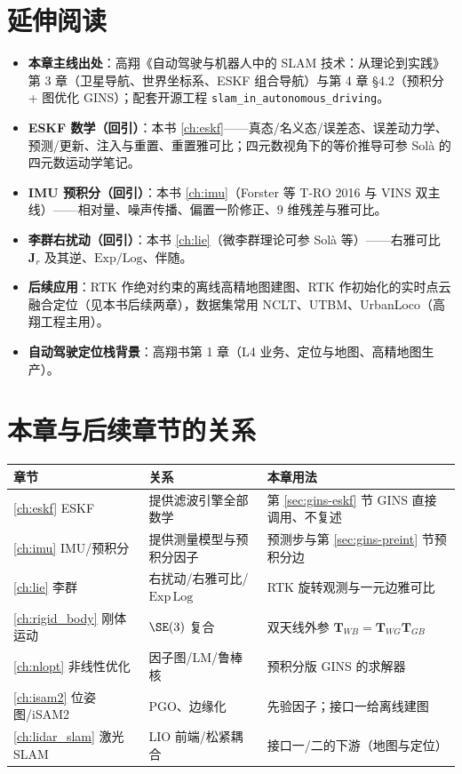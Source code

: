 \section*{延伸阅读}
\begin{itemize}
  \item \textbf{本章主线出处}：高翔《自动驾驶与机器人中的 SLAM 技术：从理论到实践》\cite{gao2023slamad} 第 3 章（卫星导航、世界坐标系、ESKF 组合导航）与第 4 章 §4.2（预积分 + 图优化 GINS）；配套开源工程 \texttt{slam\_in\_autonomous\_driving}。
  \item \textbf{ESKF 数学（回引）}：本书 \cref{ch:eskf}——真态/名义态/误差态、误差动力学、预测/更新、注入与重置、重置雅可比；四元数视角下的等价推导可参 Solà 的四元数运动学笔记\cite{sola2017quaternion}。
  \item \textbf{IMU 预积分（回引）}：本书 \cref{ch:imu}（Forster 等 T-RO 2016\cite{forster2017preintegration} 与 VINS 双主线）——相对量、噪声传播、偏置一阶修正、$9$ 维残差与雅可比。
  \item \textbf{李群右扰动（回引）}：本书 \cref{ch:lie}（微李群理论可参 Solà 等\cite{sola2018micro}）——右雅可比 $\mathbf{J}_r$ 及其逆、$\mathrm{Exp}/\mathrm{Log}$、伴随。
  \item \textbf{后续应用}：RTK 作绝对约束的离线高精地图建图、RTK 作初始化的实时点云融合定位（见本书后续两章），数据集常用 NCLT、UTBM、UrbanLoco（高翔工程主用）。
  \item \textbf{自动驾驶定位栈背景}：高翔书第 1 章（L4 业务、定位与地图、高精地图生产）。
\end{itemize}

\section*{本章与后续章节的关系}
\begin{table}[H]\centering\small
\begin{tabular}{lll}
\toprule
章节 & 关系 & 本章用法 \\
\midrule
\cref{ch:eskf} ESKF & 提供滤波引擎全部数学 & 第 \ref{sec:gins-eskf} 节 GINS 直接调用、不复述 \\
\cref{ch:imu} IMU/预积分 & 提供测量模型与预积分因子 & 预测步与第 \ref{sec:gins-preint} 节预积分边 \\
\cref{ch:lie} 李群 & 右扰动/右雅可比/$\mathrm{Exp}\,\mathrm{Log}$ & RTK 旋转观测与一元边雅可比 \\
\cref{ch:rigid_body} 刚体运动 & $\SE(3)$ 复合 & 双天线外参 $\mathbf{T}_{WB}=\mathbf{T}_{WG}\mathbf{T}_{GB}$ \\
\cref{ch:nlopt} 非线性优化 & 因子图/LM/鲁棒核 & 预积分版 GINS 的求解器 \\
\cref{ch:isam2} 位姿图/iSAM2 & PGO、边缘化 & 先验因子；接口一给离线建图 \\
\cref{ch:lidar_slam} 激光 SLAM & LIO 前端/松紧耦合 & 接口一/二的下游（地图与定位） \\
\bottomrule
\end{tabular}
\end{table}

